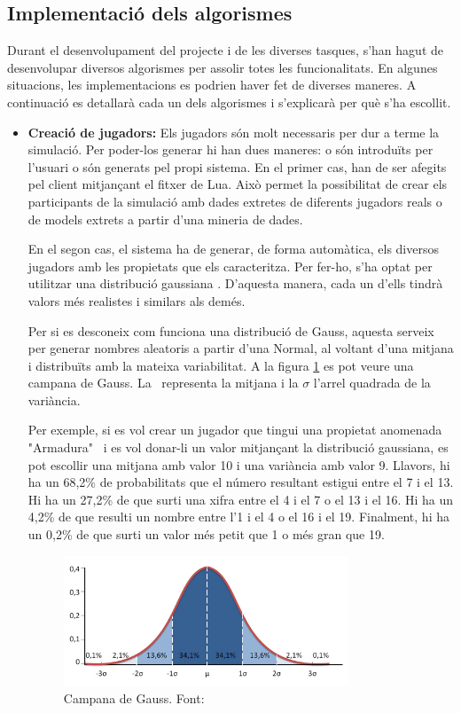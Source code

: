 \documentclass[a4paper]{article}
\begin{document}
\subsection{Implementació dels algorismes}
Durant el desenvolupament del projecte i de les diverses tasques, s'han hagut de desenvolupar diversos algorismes per assolir totes les funcionalitats. En algunes situacions, les implementacions es podrien haver fet de diverses maneres. A continuació es detallarà cada un dels algorismes i s'explicarà per què s'ha escollit.

\begin{itemize}
    \item \textbf{Creació de jugadors:} Els jugadors són molt necessaris per dur a terme la simulació. Per poder-los generar hi han dues maneres: o són introduïts per l'usuari o són generats pel propi sistema. En el primer cas, han de ser afegits pel client mitjançant el fitxer de Lua. Això permet la possibilitat de crear els participants de la simulació amb dades extretes de diferents jugadors reals o de models extrets a partir d'una mineria de dades.
    
    En el segon cas, el sistema ha de generar, de forma automàtica, els diversos jugadors amb les propietats que els caracteritza. Per fer-ho, s'ha optat per utilitzar una distribució gaussiana \cite{wikipediaGauss}. D'aquesta manera, cada un d'ells tindrà valors més realistes i similars als demés. 
    
    Per si es desconeix com funciona una distribució de Gauss, aquesta serveix per generar nombres aleatoris a partir d'una Normal, al voltant d'una mitjana i distribuïts amb la mateixa variabilitat. A la figura \ref{fig:campanaGaussImage} es pot veure una campana de Gauss. La \textmu \, representa la mitjana i la $\sigma$ l'arrel quadrada de la variància.
    
    Per exemple, si es vol crear un jugador que tingui una propietat anomenada "Armadura" \, i es vol donar-li un valor mitjançant la distribució gaussiana, es pot escollir una mitjana amb valor 10 i una variància amb valor 9. Llavors, hi ha un 68,2\% de probabilitats que el número resultant estigui entre el 7 i el 13. Hi ha un 27,2\% de que surti una xifra entre el 4 i el 7 o el 13 i el 16. Hi ha un 4,2\% de que resulti un nombre entre l'1 i el 4 o el 16 i el 19. Finalment, hi ha un 0,2\% de que surti un valor més petit que 1 o més gran que 19. 
    
        \begin{figure}[H]
        \centering
        \includegraphics[width=0.8\textwidth]{images/gaussImage.jpg}
        \caption[Campana de Gauss]{Campana de Gauss. Font: \cite{campanaGauss}}
        \label{fig:campanaGaussImage}
    \end{figure}
    

\end{itemize}
\end{document}
